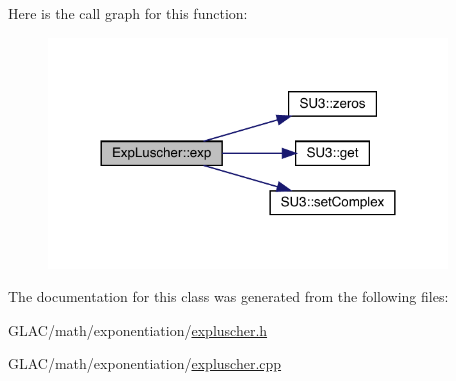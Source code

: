 Here is the call graph for this function\+:
\nopagebreak
\begin{figure}[H]
\begin{center}
\leavevmode
\includegraphics[width=300pt]{class_exp_luscher_a8e4c0689c633728527e1220094c664c1_cgraph}
\end{center}
\end{figure}


The documentation for this class was generated from the following files\+:\begin{DoxyCompactItemize}
\item 
G\+L\+A\+C/math/exponentiation/\mbox{\hyperlink{expluscher_8h}{expluscher.\+h}}\item 
G\+L\+A\+C/math/exponentiation/\mbox{\hyperlink{expluscher_8cpp}{expluscher.\+cpp}}\end{DoxyCompactItemize}

